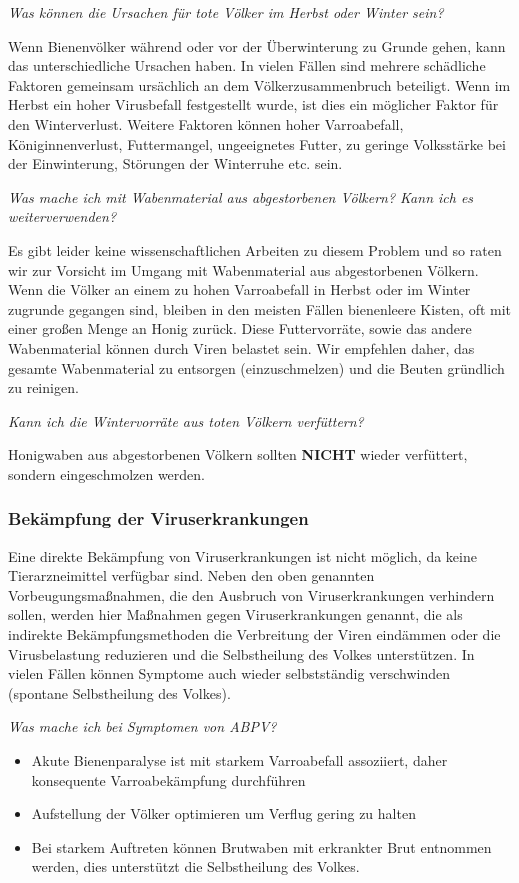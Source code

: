 \textit{Was können die Ursachen für tote Völker im Herbst oder Winter sein?}

Wenn Bienenvölker während oder vor der Überwinterung zu Grunde gehen, kann das unterschiedliche Ursachen haben. In vielen Fällen sind mehrere schädliche Faktoren gemeinsam ursächlich an dem Völkerzusammenbruch beteiligt. Wenn im Herbst ein hoher Virusbefall festgestellt wurde, ist dies ein möglicher Faktor für den Winterverlust. Weitere Faktoren können hoher Varroabefall, Königinnenverlust, Futtermangel, ungeeignetes Futter, zu geringe Volksstärke bei der Einwinterung, Störungen der Winterruhe etc. sein.

\textit{Was mache ich mit Wabenmaterial aus abgestorbenen Völkern? Kann ich es weiterverwenden?}

Es gibt leider keine wissenschaftlichen Arbeiten zu diesem Problem und so raten wir zur Vorsicht im Umgang mit Wabenmaterial aus abgestorbenen Völkern. Wenn die Völker an einem zu hohen Varroabefall in Herbst oder im Winter zugrunde gegangen sind, bleiben in den meisten Fällen bienenleere Kisten, oft mit einer großen Menge an Honig zurück. Diese Futtervorräte, sowie das andere Wabenmaterial können durch Viren belastet sein. Wir empfehlen daher, das gesamte Wabenmaterial zu entsorgen (einzuschmelzen) und die Beuten gründlich zu reinigen.

\textit{Kann ich die Wintervorräte aus toten Völkern verfüttern?}

Honigwaben aus abgestorbenen Völkern sollten \textbf{NICHT} wieder verfüttert, sondern eingeschmolzen werden.

\subsubsection{Bekämpfung der Viruserkrankungen}

Eine direkte Bekämpfung von Viruserkrankungen ist nicht möglich, da keine Tierarzneimittel verfügbar sind. Neben den oben genannten Vorbeugungsmaßnahmen, die den Ausbruch von Viruserkrankungen verhindern sollen, werden hier Maßnahmen gegen Viruserkrankungen genannt, die als indirekte Bekämpfungsmethoden die Verbreitung der Viren eindämmen oder die Virusbelastung reduzieren und die Selbstheilung des Volkes unterstützen. In vielen Fällen können Symptome auch wieder selbstständig verschwinden (spontane Selbstheilung des Volkes).

\textit{Was mache ich bei Symptomen von ABPV?}

\begin{itemize}
    \item Akute Bienenparalyse ist mit starkem Varroabefall assoziiert, daher konsequente Varroabekämpfung durchführen
    \item Aufstellung der Völker optimieren um Verflug gering zu halten
    \item Bei starkem Auftreten können Brutwaben mit erkrankter Brut entnommen werden, dies unterstützt die Selbstheilung des Volkes.
\end{itemize}

